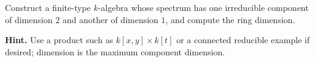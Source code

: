 \begin{problem}\label{chal:vi29-02}
Construct a finite-type $k$-algebra whose spectrum has one irreducible component of dimension $2$ and another of dimension $1$, and compute the ring dimension.

\textbf{Hint.} Use a product such as $k[x,y]\times k[t]$ or a connected reducible example if desired; dimension is the maximum component dimension.
\end{problem}
